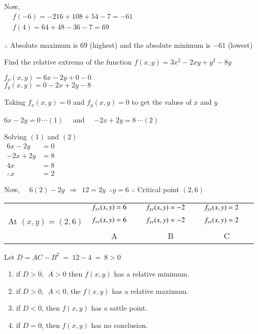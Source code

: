 \documentclass[12pt]{article}
\begin{document}
\vspace{-0.5\baselineskip}
Now,\\
$\begin{aligned}
& f(-6) = -216+108+54-7 = -61 \\
& f(4) = 64 + 48 -36 -7 = 69
\end{aligned}$

$\therefore$ Absolute maximum is $69$ (highest) and the absolute minimum is $-61$ (lowest)



\pagebreak
\textbf{\mred{\#}} Find the relative extrema of the function
$f(x, y)=3 x^2-2 x y+y^2-8 y$


\begin{minipage}[t]{0.39\linewidth}
\noindent
   $f_x(x,y) = 6 x-2 y+0-0$\\
   $f_y(x,y) = 0-2x+2y-8$
\end{minipage}\hspace{0.5ex}{\vrule width 1pt}\hspace{0.5ex}
\begin{minipage}[t]{0.59\linewidth}
\noindent
Taking $f_x(x, y)=0$ and $f_y(x, y)=0$ to get the values of $x$ and $y$

$6 x-2 y = 0 \ \cdots (1)$ \ \ and \ \ $-2 x+2 y = 8 \ \cdots (2)$
\end{minipage}

\vspace{2ex}
Solving $(1)$ and $(2)$\\
$\begin{aligned}
6 x-2 y & =0 \\
-2 x+2 y & =8 \\
\hline 4 x & =8 \\
\therefore x & =2
\end{aligned}$

Now, \ \ $6(2)-2y \ \ \Rightarrow \ \ 12 = 2y \ \ \therefore y =6$ \tabs \tabs $\therefore$ Critical point $(2,6)$


\begin{tabular}{lccc}
   & $f_{x x}(x, y) = 6 \ \ \ \ \ \ $
   & $f_{x y}(x, y) = -2 \ \ \ \ \ \ $
   & $f_{y y}(x, y) = 2 \ \ \ \ \ \ $ \\
   At $(x, y) = (2,6)$
   & $f_{x x}(x, y) = 6 \ \ \ \ \ \ $
   & $f_{x y}(x, y) = -2 \ \ \ \ \ \ $
   & $f_{y y}(x, y) = 2 \ \ \ \ \ \ $\\
   & A & B & C
\end{tabular}

Let $D=AC-B^2 \ = \ 12-4 \ = \ 8>0$\\[-5ex]
\begin{enumerate}[label=(\alph*) \ ]
   \item if $D>0, \ \ A>0$ then $f(x, y)$ has a relative minimum.
   \item if $D>0, \ \ A<0$, the $f(x, y)$ has a relative maximum.
   \item if $D<0$, then $f(x, y)$ has a sattle point.
   \item if $D=0$, then $f(x, y)$ has no conclusion.
\end{enumerate}
\end{document}
